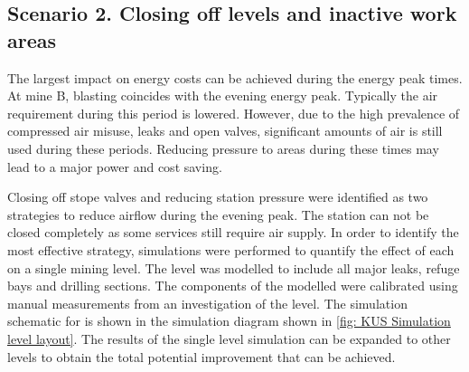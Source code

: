	\subsection{Scenario 2. Closing off levels and inactive work areas}
	The largest impact on energy costs can be achieved during the energy peak times. At mine B, blasting coincides with the evening energy peak. Typically the air requirement during this period is lowered. However, due to the high prevalence of compressed air misuse, leaks and open valves, significant amounts of air is still used during these periods. Reducing pressure to areas during these times may lead to a major power and cost saving. 
	\par 
	Closing off stope valves and reducing station pressure were identified as two strategies to reduce airflow during the evening peak. The station can not be closed completely as some services still require air supply. In order to identify the most effective strategy, simulations were performed to quantify the effect of each on a single mining level. The level was modelled to include all major leaks, refuge bays and drilling sections. The components of the modelled were calibrated using manual measurements from an investigation of the level. The simulation schematic for is shown in the simulation diagram shown in \cref{fig: KUS Simulation level layout}. The results of the single level simulation can be expanded to other levels to obtain the total potential improvement that can be achieved.
